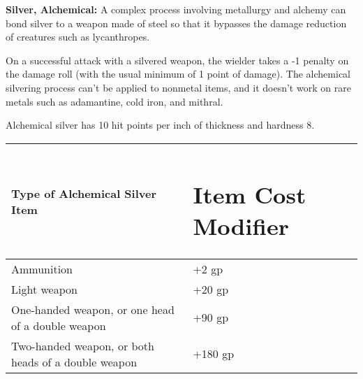 \documentclass{article}
\begin{document}
\vspace{12pt}
\textbf{Silver, Alchemical:} A complex process involving metallurgy and alchemy 
can bond silver to a weapon made of steel so that it bypasses the damage reduction 
of creatures such as lycanthropes.

On a successful attack with a silvered weapon, the wielder takes a -1 penalty on 
the damage roll (with the usual minimum of 1 point of damage). The alchemical silvering 
process can't be applied to nonmetal items, and it doesn't work on rare metals 
such as adamantine, cold iron, and mithral.

Alchemical silver has 10 hit points per inch of thickness and hardness 8.

\begin{tabular}{|>{\raggedright}p{222pt}|>{\raggedright}p{81pt}|}
\hline
T\textbf{ype of Alchemical Silver Item} & \section*{I\textbf{tem Cost Modifier}}\tabularnewline
\hline
Ammunition & +2 gp\tabularnewline
\hline
Light weapon & +20 gp\tabularnewline
\hline
One-handed weapon, or one head of a double weapon & +90 gp\tabularnewline
\hline
Two-handed weapon, or both heads of a double weapon & +180 gp\tabularnewline
\hline
\end{tabular}

\newpage
\end{document}
